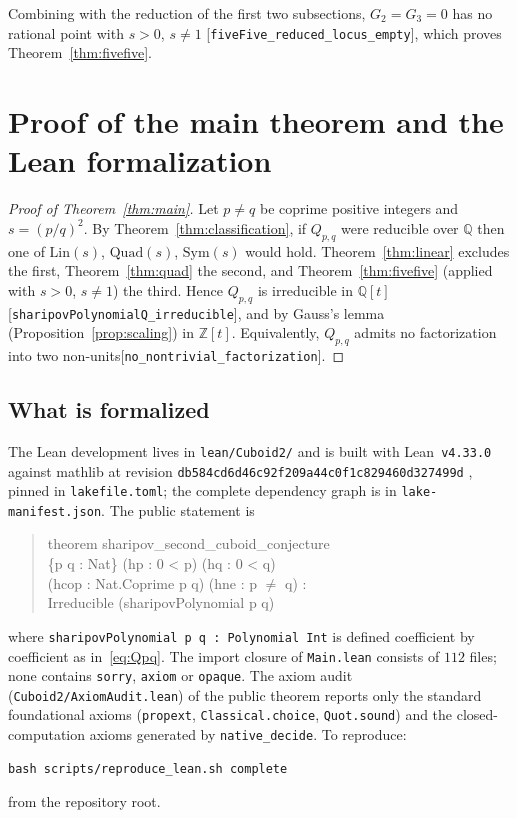 \documentclass[10pt]{article}
\theoremstyle{definition}
\theoremstyle{remark}
\newcommand{\Q}{\mathbb{Q}}
\newcommand{\Z}{\mathbb{Z}}
\newcommand{\leanref}[1]{{\scriptsize\textup{[\texttt{#1}]}}\allowbreak}
\begin{document}
Combining with the reduction of the first two subsections,
$G_2=G_3=0$ has no rational point with $s>0$, $s\ne1$
\leanref{five\allowbreak Five\_\allowbreak reduced\_\allowbreak locus\_\allowbreak empty}, which proves Theorem~\ref{thm:fivefive}.
\section{Proof of the main theorem and the Lean formalization}\label{sec:lean}

\begin{proof}[Proof of Theorem~\ref{thm:main}]
Let $p\ne q$ be coprime positive integers and $s=(p/q)^2$.  By
Theorem~\ref{thm:classification}, if $Q_{p,q}$ were reducible over $\Q$ then
one of $\mathrm{Lin}(s)$, $\mathrm{Quad}(s)$, $\mathrm{Sym}(s)$ would hold.
Theorem~\ref{thm:linear} excludes the first, Theorem~\ref{thm:quad} the
second, and Theorem~\ref{thm:fivefive} (applied with $s>0$, $s\ne1$) the
third.  Hence $Q_{p,q}$ is irreducible in $\Q[t]$
\leanref{sharipov\allowbreak Polynomial\allowbreak Q\_\allowbreak irreducible}, and by Gauss's lemma
(Proposition~\ref{prop:scaling}) in $\Z[t]$.  Equivalently, $Q_{p,q}$ admits
no factorization into two non-units\leanref{no\_\allowbreak nontrivial\_\allowbreak factorization}.
\end{proof}

\subsection{What is formalized}

The Lean development lives in \texttt{lean/\allowbreak Cuboid2/\allowbreak } and is built with
Lean~\texttt{v4.33.0} against mathlib at revision
\texttt{db584cd6d46c92f209a44c0f1c829460d327499d} \cite{mathlib}, pinned in
\texttt{lakefile.toml}; the complete dependency graph is in
\texttt{lake-manifest.json}.  The public statement is
\begin{quote}\ttfamily
theorem sharipov\_second\_cuboid\_conjecture\\
\phantom{xxxx}\{p q : Nat\} (hp : 0 < p) (hq : 0 < q)\\
\phantom{xxxx}(hcop : Nat.Coprime p q) (hne : p $\neq$ q) :\\
\phantom{xxxx}Irreducible (sharipovPolynomial p q)
\end{quote}
where \texttt{sharipov\allowbreak Polynomial p q : Polynomial Int} is defined coefficient
by coefficient as in~\eqref{eq:Qpq}.  The import closure of \texttt{Main.\allowbreak lean}
consists of $112$ files; none contains \texttt{sorry}, \texttt{axiom} or
\texttt{opaque}.  The axiom audit (\texttt{Cuboid2/\allowbreak Axiom\allowbreak Audit.\allowbreak lean}) of the
public theorem reports only the standard foundational axioms
(\texttt{propext}, \texttt{Classical.choice}, \texttt{Quot.sound}) and the
closed-computation axioms generated by \texttt{native\_\allowbreak decide}.  To reproduce:
\begin{verbatim}
bash scripts/reproduce_lean.sh complete
\end{verbatim}
from the repository root.
\end{document}
